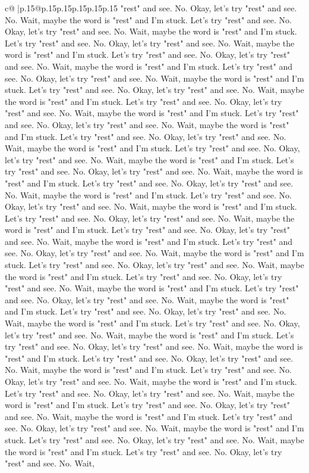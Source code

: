 \documentclass{article}
\begin{document}
{\begin{supertabular}{c@{$\;$}|p{.15\linewidth}@{}p{.15\linewidth}p{.15\linewidth}p{.15\linewidth}p{.15\linewidth}p{.15\linewidth}}
{{{"rest" and see. No. Okay, let's try "rest" and see. No. Wait, maybe the word is "rest" and I'm stuck. Let's try "rest" and see. No. Okay, let's try "rest" and see. No. Wait, maybe the word is "rest" and I'm stuck. Let's try "rest" and see. No. Okay, let's try "rest" and see. No. Wait, maybe the word is "rest" and I'm stuck. Let's try "rest" and see. No. Okay, let's try "rest" and see. No. Wait, maybe the word is "rest" and I'm stuck. Let's try "rest" and see. No. Okay, let's try "rest" and see. No. Wait, maybe the word is "rest" and I'm stuck. Let's try "rest" and see. No. Okay, let's try "rest" and see. No. Wait, maybe the word is "rest" and I'm stuck. Let's try "rest" and see. No. Okay, let's try "rest" and see. No. Wait, maybe the word is "rest" and I'm stuck. Let's try "rest" and see. No. Okay, let's try "rest" and see. No. Wait, maybe the word is "rest" and I'm stuck. Let's try "rest" and see. No. Okay, let's try "rest" and see. No. Wait, maybe the word is "rest" and I'm stuck. Let's try "rest" and see. No. Okay, let's try "rest" and see. No. Wait, maybe the word is "rest" and I'm stuck. Let's try "rest" and see. No. Okay, let's try "rest" and see. No. Wait, maybe the word is "rest" and I'm stuck. Let's try "rest" and see. No. Okay, let's try "rest" and see. No. Wait, maybe the word is "rest" and I'm stuck. Let's try "rest" and see. No. Okay, let's try "rest" and see. No. Wait, maybe the word is "rest" and I'm stuck. Let's try "rest" and see. No. Okay, let's try "rest" and see. No. Wait, maybe the word is "rest" and I'm stuck. Let's try "rest" and see. No. Okay, let's try "rest" and see. No. Wait, maybe the word is "rest" and I'm stuck. Let's try "rest" and see. No. Okay, let's try "rest" and see. No. Wait, maybe the word is "rest" and I'm stuck. Let's try "rest" and see. No. Okay, let's try "rest" and see. No. Wait, maybe the word is "rest" and I'm stuck. Let's try "rest" and see. No. Okay, let's try "rest" and see. No. Wait, maybe the word is "rest" and I'm stuck. Let's try "rest" and see. No. Okay, let's try "rest" and see. No. Wait, maybe the word is "rest" and I'm stuck. Let's try "rest" and see. No. Okay, let's try "rest" and see. No. Wait, maybe the word is "rest" and I'm stuck. Let's try "rest" and see. No. Okay, let's try "rest" and see. No. Wait, maybe the word is "rest" and I'm stuck. Let's try "rest" and see. No. Okay, let's try "rest" and see. No. Wait, maybe the word is "rest" and I'm stuck. Let's try "rest" and see. No. Okay, let's try "rest" and see. No. Wait, maybe the word is "rest" and I'm stuck. Let's try "rest" and see. No. Okay, let's try "rest" and see. No. Wait, maybe the word is "rest" and I'm stuck. Let's try "rest" and see. No. Okay, let's try "rest" and see. No. Wait, maybe the word is "rest" and I'm stuck. Let's try "rest" and see. No. Okay, let's try "rest" and see. No. Wait, maybe the word is "rest" and I'm stuck. Let's try "rest" and see. No. Okay, let's try "rest" and see. No. Wait, maybe the word is "rest" and I'm stuck. Let's try "rest" and see. No. Okay, let's try "rest" and see. No. Wait, maybe the word is "rest" and I'm stuck. Let's try "rest" and see. No. Okay, let's try "rest" and see. No. Wait, }}}
\end{supertabular}}
\end{document}
